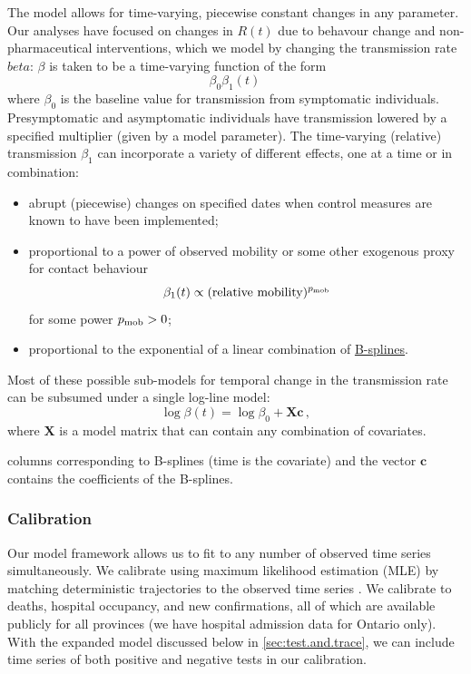 \documentclass[12pt]{article}\usepackage[]{graphicx}\usepackage[]{color}
\begin{document}
The model allows for time-varying, piecewise constant changes in any
parameter. Our analyses have focused on changes in $R(t)$ due
to behavour change and non-pharmaceutical interventions, which we model
by changing the transmission rate $beta$: $\beta$
is taken to be a time-varying function of the form
\begin{equation}
  \beta_0 \beta_1(t)  \,
\end{equation}
where $\beta_0$ is the baseline value for transmission
from symptomatic individuals. Presymptomatic and asymptomatic individuals have transmission
lowered by a specified multiplier (given by a model parameter).
The time-varying (relative) transmission $\beta_1$ can incorporate a variety of different effects, one at a time or in combination:
\begin{itemize}
\item abrupt (piecewise) changes on specified dates when control
  measures are known to have been implemented;
\item proportional to a power of observed mobility or some other
  exogenous proxy for contact behaviour
\begin{equation}\label{eq:pmob}
  \beta_1(t) \propto (\text{relative mobility})^{p_{\rm mob}}
\end{equation}
for some power $p_{\rm mob}>0$;
\item proportional to the exponential of a linear combination of
  \href{https://en.wikipedia.org/wiki/B-spline}{B-splines}.
\end{itemize}

Most of these possible sub-models for temporal change in the transmission
rate can be subsumed under a single log-line model:
\begin{equation}\label{eq:betamodel}
\log \beta(t) = \log \beta_0 + \boldsymbol{X}\boldsymbol{c}
\,,
\end{equation}
where $\boldsymbol{X}$ is a model matrix that can contain any combination
of covariates.

columns corresponding to B-splines (time is the covariate) and the
vector $\boldsymbol{c}$ contains the coefficients of the B-splines.

\subsubsection*{Calibration}

Our model framework allows us to fit to any number of observed time
series simultaneously.  We calibrate using
maximum likelihood estimation (MLE) by matching deterministic
trajectories to the observed time series \cite{Bolk08}.  We calibrate
to deaths, hospital occupancy, and new confirmations, all of which are
available publicly for all provinces (we have hospital admission data
for Ontario only).  With the expanded model discussed below in
\cref{sec:test.and.trace}, we can include time series of both positive
and negative tests in our calibration.
\end{document}
